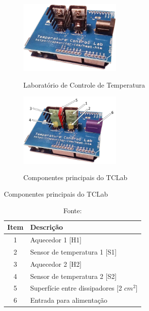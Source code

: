 \begin{figure}[h]
	\caption{Laboratório de Controle de Temperatura}
	\begin{center}
		\includegraphics[width=0.45\textwidth]{./5_images/tclab.png} 
		\label{fig:tclab}
	\end{center}
	\centering
\end{figure}

\begin{figure}[h]
	\caption{Componentes principais do TCLab}
	\begin{center}
		\includegraphics[width=0.45\textwidth]{./5_images/tclab_color_numbers.png} 
		\label{fig:tclab_description}
	\end{center}
	\centering
\end{figure}

\begin{table}[h]
	\centering
	\caption{Componentes principais do TCLab}
	\label{tab:componentes_tclabsp}
	\begin{tabular}{cl} \toprule
		{Item}			& {Descrição} 									\\ \midrule
		1		 		& Aquecedor 1 [H1]		 						\\
		2				& Sensor de temperatura 1 [S1]					\\
		3				& Aquecedor 2 [H2]								\\
		4				& Sensor de temperatura 2 [S2]					\\
		5				& Superfície entre dissipadores [2 $cm^2$]		\\
		6				& Entrada para alimentação						\\ \bottomrule
	\end{tabular}
	\caption*{Fonte: }
\end{table}

